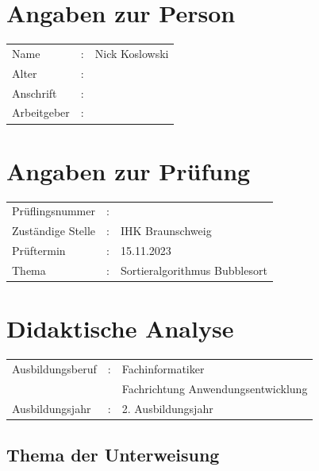 



\frontmatter
{}
\chapter{Angaben zur Person}
{
\begin{tabular}{p{3.06cm}cl}
Name &:& Nick Koslowski\\[0.5ex]
Alter &:& \\[0.5ex]
Anschrift &:& \\[0.5ex]
Arbeitgeber &:& \\[0.5ex]
\end{tabular}
}

{
\let\clearpage\relax 
\chapter{Angaben zur Prüfung}
\begin{tabular}{p{3.06cm}cl}
Prüflingsnummer &:& \\[0.5ex]
Zuständige Stelle &:& IHK Braunschweig\\[0.5ex]
Prüftermin &:& 15.11.2023\\[0.5ex]
Thema &:& Sortieralgorithmus Bubblesort\\[0.5ex]
\end{tabular}
}




\cleardoubleemptypage
\tableofcontents

\mainmatter

\chapter{Didaktische Analyse}
{
\begin{tabular}{p{2.8cm}cl}
Ausbildungsberuf &:& Fachinformatiker\\[0.5ex]
&& Fachrichtung Anwendungsentwicklung\\[0.5ex]
Ausbildungsjahr &:& 2. Ausbildungsjahr\\[0.5ex]
\end{tabular}
}

\section{Thema der Unterweisung}

